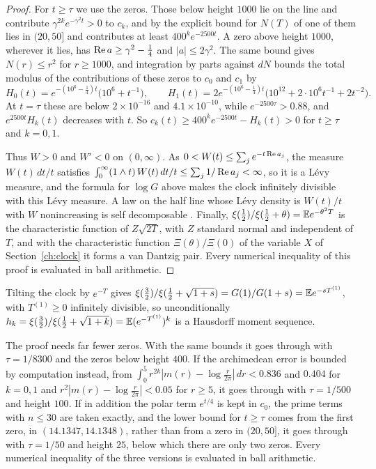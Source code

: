 \begin{proof}
For $t\ge\tau$ we use the zeros. Those below height $1000$ lie on the line \cite{PT21} and contribute $\gamma^{2k}e^{-\gamma^2t}>0$ to $c_k$, and by the explicit bound for $N(T)$ of \cite{HSW22} one of them lies in $(20,50]$ and contributes at least $400^ke^{-2500t}$. A zero above height $1000$, wherever it lies, has $\operatorname{Re} a\ge\gamma^2-\frac14$ and $|a|\le2\gamma^2$. The same bound gives $N(r)\le r^2$ for $r\ge1000$, and integration by parts against $dN$ bounds the total modulus of the contributions of these zeros to $c_0$ and $c_1$ by
\[
H_0(t)=e^{-(10^6-\frac14)t}\big(10^6+t^{-1}\big),\qquad H_1(t)=2e^{-(10^6-\frac14)t}\big(10^{12}+2\cdot10^6t^{-1}+2t^{-2}\big).
\]
At $t=\tau$ these are below $2\times10^{-16}$ and $4.1\times10^{-10}$, while $e^{-2500\tau}>0.88$, and $e^{2500t}H_k(t)$ decreases with $t$. So $c_k(t)\ge400^ke^{-2500t}-H_k(t)>0$ for $t\ge\tau$ and $k=0,1$.

Thus $W>0$ and $W'<0$ on $(0,\infty)$. As $0<W(t)\le\sum_je^{-t\operatorname{Re} a_j}$, the measure $W(t)\,dt/t$ satisfies $\int_0^\infty(1\wedge t)\,W(t)\,dt/t\le\sum_j1/\operatorname{Re} a_j<\infty$, so it is a L\'evy measure, and the formula for $\log G$ above makes the clock infinitely divisible with this L\'evy measure. A law on the half line whose L\'evy density is $W(t)/t$ with $W$ nonincreasing is self decomposable \cite[Corollary 15.11]{Sato99}. Finally, $\xi(\frac12)/\xi(\frac12+\theta)=\mathbb{E} e^{-\theta^2T}$ is the characteristic function of $Z\sqrt{2T}$, with $Z$ standard normal and independent of $T$, and with the characteristic function $\Xi(\theta)/\Xi(0)$ of the variable $X$ of Section~\ref{ch:clock} it forms a van Dantzig pair. Every numerical inequality of this proof is evaluated in ball arithmetic.
\end{proof}

Tilting the clock by $e^{-T}$ gives $\xi(\frac32)/\xi(\frac12+\sqrt{1+s})=G(1)/G(1+s)=\mathbb{E} e^{-sT^{(1)}}$, with $T^{(1)}\ge0$ infinitely divisible, so unconditionally $h_k=\xi(\frac32)/\xi(\frac12+\sqrt{1+k})=\mathbb{E}(e^{-T^{(1)}})^k$ is a Hausdorff moment sequence.

The proof needs far fewer zeros. With the same bounds it goes through with $\tau=1/8300$ and the zeros below height $400$. If the archimedean error is bounded by computation instead, from $\int_0^5r^{2k}|m(r)-\log\frac r{2\pi}|\,dr<0.836$ and $0.404$ for $k=0,1$ and $r^2|m(r)-\log\frac r{2\pi}|<0.05$ for $r\ge5$, it goes through with $\tau=1/500$ and height $100$. If in addition the polar term $e^{t/4}$ is kept in $c_0$, the prime terms with $n\le30$ are taken exactly, and the lower bound for $t\ge\tau$ comes from the first zero, in $(14.1347,14.1348)$, rather than from a zero in $(20,50]$, it goes through with $\tau=1/50$ and height $25$, below which there are only two zeros. Every numerical inequality of the three versions is evaluated in ball arithmetic.

